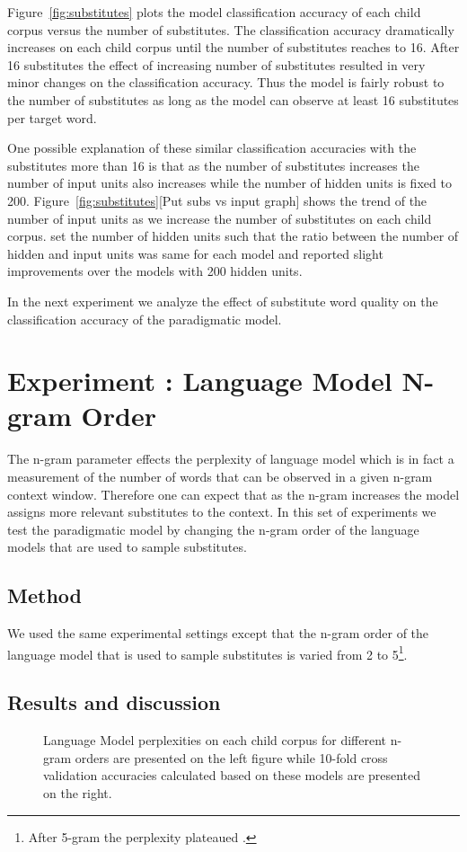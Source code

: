 Figure~\ref{fig:substitutes} plots the model classification accuracy of each
child corpus versus the number of substitutes.  The classification accuracy
dramatically increases on each child corpus until the number of substitutes
reaches to 16.   After 16 substitutes the effect of increasing number of
substitutes resulted in very minor changes on the classification accuracy.
Thus the model is fairly robust to the number of substitutes as long as the
model can observe at least 16 substitutes per target word.  

One possible explanation of these similar classification accuracies with the
substitutes more than 16 is that as the number of substitutes increases the
number of input units also increases while the number of hidden units is fixed
to 200. Figure~\ref{fig:substitutes}[Put subs vs input graph] shows the trend
of the number of input units as we increase the number of substitutes on each
child corpus.  \cite{clair2010} set the number of hidden units such that the
ratio between the number of hidden and input units was same for each model and
reported slight improvements over the models with 200 hidden units.  

In the next experiment we analyze the effect of substitute word quality on the
classification accuracy of the paradigmatic model.

\section{Experiment : Language Model N-gram Order}
\label{s:exp_ngram}
The n-gram parameter effects the perplexity of language model which is in fact
a measurement of the number of words that can be observed in a given n-gram
context window.  Therefore one can expect that as the n-gram increases the
model assigns more relevant substitutes to the context.  In this set of
experiments we test the paradigmatic model by changing the n-gram order of the
language models that are used to sample substitutes.

\subsection{Method}
We used the same experimental settings except that the n-gram order of the
language model that is used to sample substitutes is varied from 2 to
5\footnote{After 5-gram the perplexity plateaued \citep*{Goodman2001403}.}. 

\subsection{Results and discussion}
\begin{figure}[h!]
  \caption{Language Model perplexities on each child corpus for different
  n-gram orders are presented on the left figure while 10-fold cross validation
  accuracies calculated based on these models are presented on the right.} 
\end{figure}

